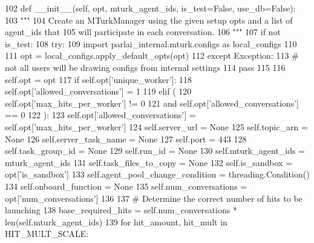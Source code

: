 \begin{DoxyCode}
102     \textcolor{keyword}{def }\_\_init\_\_(self, opt, mturk\_agent\_ids, is\_test=False, use\_db=False):
103         \textcolor{stringliteral}{"""}
104 \textcolor{stringliteral}{        Create an MTurkManager using the given setup opts and a list of agent\_ids that}
105 \textcolor{stringliteral}{        will participate in each conversation.}
106 \textcolor{stringliteral}{        """}
107         \textcolor{keywordflow}{if} \textcolor{keywordflow}{not} is\_test:
108             \textcolor{keywordflow}{try}:
109                 \textcolor{keyword}{import} parlai\_internal.mturk.configs \textcolor{keyword}{as} local\_configs
110 
111                 opt = local\_configs.apply\_default\_opts(opt)
112             \textcolor{keywordflow}{except} Exception:
113                 \textcolor{comment}{# not all users will be drawing configs from internal settings}
114                 \textcolor{keywordflow}{pass}
115 
116         self.opt = opt
117         \textcolor{keywordflow}{if} self.opt[\textcolor{stringliteral}{'unique\_worker'}]:
118             self.opt[\textcolor{stringliteral}{'allowed\_conversations'}] = 1
119         \textcolor{keywordflow}{elif} (
120             self.opt[\textcolor{stringliteral}{'max\_hits\_per\_worker'}] != 0
121             \textcolor{keywordflow}{and} self.opt[\textcolor{stringliteral}{'allowed\_conversations'}] == 0
122         ):
123             self.opt[\textcolor{stringliteral}{'allowed\_conversations'}] = self.opt[\textcolor{stringliteral}{'max\_hits\_per\_worker'}]
124         self.server\_url = \textcolor{keywordtype}{None}
125         self.topic\_arn = \textcolor{keywordtype}{None}
126         self.server\_task\_name = \textcolor{keywordtype}{None}
127         self.port = 443
128         self.task\_group\_id = \textcolor{keywordtype}{None}
129         self.run\_id = \textcolor{keywordtype}{None}
130         self.mturk\_agent\_ids = mturk\_agent\_ids
131         self.task\_files\_to\_copy = \textcolor{keywordtype}{None}
132         self.is\_sandbox = opt[\textcolor{stringliteral}{'is\_sandbox'}]
133         self.agent\_pool\_change\_condition = threading.Condition()
134         self.onboard\_function = \textcolor{keywordtype}{None}
135         self.num\_conversations = opt[\textcolor{stringliteral}{'num\_conversations'}]
136 
137         \textcolor{comment}{# Determine the correct number of hits to be launching}
138         base\_required\_hits = self.num\_conversations * len(self.mturk\_agent\_ids)
139         \textcolor{keywordflow}{for} hit\_amount, hit\_mult \textcolor{keywordflow}{in} HIT\_MULT\_SCALE:

\end{DoxyCode}
